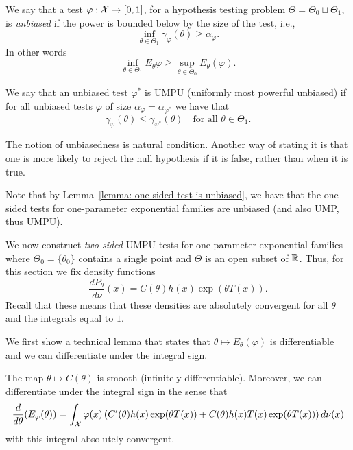 \documentclass[twoside, a4paper, 10pt]{amsart}
\begin{document}
\begin{mydef} We say that a test $\varphi:\mathcal{X} \to [0,1]$, for a hypothesis testing problem $\Theta = \Theta_0 \sqcup \Theta_1$, is \textit{unbiased} if the power is bounded below by the size of the test, i.e., $$\inf_{\theta \in \Theta_1} \gamma_{\varphi}(\theta) \geq \alpha_{\varphi}.$$ In other words $$\inf_{\theta \in \Theta_1} E_{\theta}\varphi \geq \sup_{\theta \in \Theta_0} E_{\theta}(\varphi).$$

We say that an unbiased test $\varphi^*$ is UMPU (uniformly most powerful unbiased) if for all unbiased tests $\varphi$ of size $\alpha_{\varphi} = \alpha_{\varphi^*}$ we have that 
$$\gamma_{\varphi}(\theta) \leq \gamma_{\varphi^*}(\theta) \quad\text{for all } \theta \in \Theta_1.$$

\end{mydef}

The notion of unbiasedness is natural condition. Another way of stating it is that one is more likely to reject the null hypothesis if it is false, rather than when it is true. 

Note that by Lemma~\ref{lemma: one-sided test is unbiased}, we have that the one-sided tests for one-parameter exponential families are unbiased (and also UMP, thus UMPU).

We now construct \textit{two-sided} UMPU tests for one-parameter exponential families where $\Theta_0 = \{\theta_{0}\}$ contains a single point and $\Theta$ is an open subset of $\mathbb{R}$. Thus, for this section we fix density functions $$\frac{dP_{\theta}}{d\nu}(x) = C(\theta)h(x) \exp(\theta T(x)).$$ Recall that these means that these densities are absolutely convergent for all $\theta$ and the integrals equal to $1$.

We first show a technical lemma that states that $\theta \mapsto E_{\theta}(\varphi)$ is differentiable and we can differentiate under the integral sign.

\begin{lemma}\label{lemma: integrate diff sign exp family} The map $\theta \mapsto C(\theta)$ is smooth (infinitely differentiable). Moreover, we can differentiate under the integral sign in the sense that 
$$\frac{d}{d\theta}(E_{\varphi}(\theta)) = \int_{\mathcal{X}} \varphi(x)\left(C'(\theta)h(x) \exp(\theta T(x)) + C(\theta)h(x)T(x) \exp(\theta T(x)) \right) d\nu(x)$$ with this integral absolutely convergent.

\end{lemma}
\end{document}
